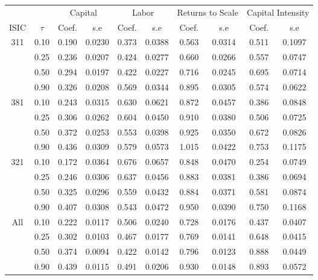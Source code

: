 \begin{table}[H]
\centering
\begin{tabular}{cccccccccc}
  \hline\hline & & \multicolumn{2}{c}{Capital}  & \multicolumn{2}{c}{Labor} & \multicolumn{2}{c}{Returns to Scale} & \multicolumn{2}{c}{Capital Intensity}\\ \cmidrule(lr){3-4} \cmidrule(lr){5-6} \cmidrule(lr){7-8} \cmidrule(lr){9-10}ISIC & $\tau$ & Coef. & s.e & Coef. & s.e & Coef. & s.e & Coef. & s.e \\ 
  \hline
311 & 0.10 & 0.190 & 0.0230 & 0.373 & 0.0388 & 0.563 & 0.0314 & 0.511 & 0.1097 \\ 
   & 0.25 & 0.236 & 0.0207 & 0.424 & 0.0277 & 0.660 & 0.0266 & 0.557 & 0.0747 \\ 
   & 0.50 & 0.294 & 0.0197 & 0.422 & 0.0227 & 0.716 & 0.0245 & 0.695 & 0.0714 \\ 
   & 0.90 & 0.326 & 0.0208 & 0.569 & 0.0344 & 0.895 & 0.0305 & 0.574 & 0.0622 \\ 
  381 & 0.10 & 0.243 & 0.0315 & 0.630 & 0.0621 & 0.872 & 0.0457 & 0.386 & 0.0848 \\ 
   & 0.25 & 0.306 & 0.0262 & 0.604 & 0.0450 & 0.910 & 0.0380 & 0.506 & 0.0725 \\ 
   & 0.50 & 0.372 & 0.0253 & 0.553 & 0.0398 & 0.925 & 0.0350 & 0.672 & 0.0826 \\ 
   & 0.90 & 0.436 & 0.0309 & 0.579 & 0.0573 & 1.015 & 0.0422 & 0.753 & 0.1175 \\ 
  321 & 0.10 & 0.172 & 0.0364 & 0.676 & 0.0657 & 0.848 & 0.0470 & 0.254 & 0.0749 \\ 
   & 0.25 & 0.246 & 0.0306 & 0.637 & 0.0456 & 0.883 & 0.0381 & 0.386 & 0.0694 \\ 
   & 0.50 & 0.325 & 0.0296 & 0.559 & 0.0432 & 0.884 & 0.0371 & 0.581 & 0.0874 \\ 
   & 0.90 & 0.407 & 0.0308 & 0.543 & 0.0472 & 0.950 & 0.0390 & 0.750 & 0.1168 \\ 
  All & 0.10 & 0.222 & 0.0117 & 0.506 & 0.0240 & 0.728 & 0.0176 & 0.437 & 0.0407 \\ 
   & 0.25 & 0.302 & 0.0103 & 0.467 & 0.0177 & 0.769 & 0.0141 & 0.648 & 0.0415 \\ 
   & 0.50 & 0.374 & 0.0094 & 0.422 & 0.0142 & 0.796 & 0.0123 & 0.888 & 0.0449 \\ 
   & 0.90 & 0.439 & 0.0115 & 0.491 & 0.0206 & 0.930 & 0.0148 & 0.893 & 0.0572 \\ 
   \hline
\end{tabular}
\end{table}

